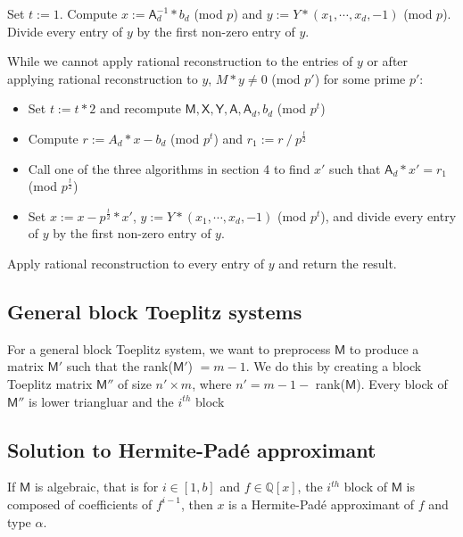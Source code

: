 \documentclass{sig-alternate}
\newcommand{\mA}{\ensuremath{\mathsf{A}}}
\newcommand{\mM}{\ensuremath{\mathsf{M}}}
\newcommand{\mX}{\ensuremath{\mathsf{X}}}
\newcommand{\mY}{\ensuremath{\mathsf{Y}}}
\begin{document}
\smallskip{} Set $t := 1$. Compute $x := \mA_d^{-1} * b_d$ (mod $p$) and
$y := Y*(x_1, \cdots, x_d, -1)$ (mod $p$). Divide every entry of $y$ by the first non-zero entry of $y$.

\smallskip{} While we cannot apply rational reconstruction to the entries of $y$ or after applying rational
reconstruction to $y$, $M*y \ne 0$ (mod $p'$) for some prime $p'$:
\begin{itemize}
	\item Set $t := t*2$ and recompute $\mM,\mX,\mY,\mA, \mA_{d}, b_d$ (mod $p^t$)
	\item Compute $r := A_d * x - b_d$ (mod $p^t$) and $r_1 := r \mathbin{/} p^{\frac{t}{2}}$
	\item Call one of the three algorithms in section 4 to find $x'$ such that $\mA_d * x' = r_1$ (mod $p^{\frac{t}{2}}$)
	\item Set $x := x - p^{\frac{t}{2}} * x'$, $y := Y*(x_1,\cdots,x_d,-1)$ (mod $p^{t}$), and divide every entry of $y$ by the first non-zero entry of $y$.
\end{itemize}
 
\smallskip{} Apply rational reconstruction to every entry of $y$ and return the result.

\subsection{General block Toeplitz systems}
For a general block Toeplitz system, we want to preprocess $\mM$ to produce a matrix $\mM'$ such that the rank($\mM'$) $= m-1$.
We do this by creating a block Toeplitz matrix $\mM''$ of size $n' \times m$, where $n' = m-1-$ rank($\mM$). Every block of $\mM''$
is lower triangluar and the $i^{th}$ block

\subsection{Solution to Hermite-Pad\'e approximant}
If $\mM$ is algebraic, that is for $i \in [1,b]$ and $f \in \mathbb{Q}[x]$, the $i^{th}$ block of $\mM$ 
is composed of coefficients of $f^{i-1}$, then $x$ is a Hermite-Pad\'e approximant of $f$ and type $\alpha$.


{\scriptsize }
\end{document}
